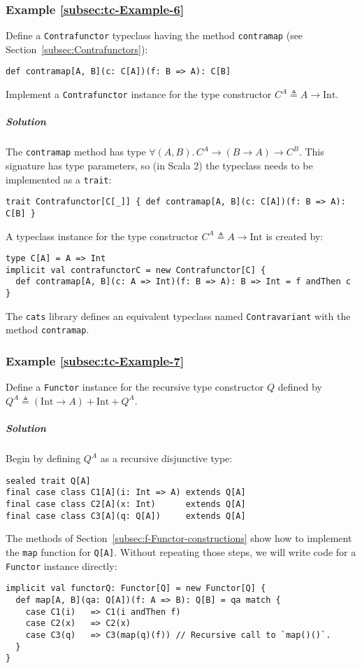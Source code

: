 \subsubsection{Example \label{subsec:tc-Example-6}\ref{subsec:tc-Example-6}}

Define a \lstinline!Contrafunctor! typeclass having the method \lstinline!contramap!
(see Section~\ref{subsec:Contrafunctors}):
\begin{lstlisting}
def contramap[A, B](c: C[A])(f: B => A): C[B]
\end{lstlisting}
Implement a \lstinline!Contrafunctor! instance for the type constructor
$C^{A}\triangleq A\rightarrow\text{Int}$.

\subparagraph{Solution}

The \lstinline!contramap! method has type $\forall(A,B).\,C^{A}\rightarrow(B\rightarrow A)\rightarrow C^{B}$.
This signature has type parameters, so (in Scala 2) the typeclass
needs to be implemented as a \lstinline!trait!:
\begin{lstlisting}
trait Contrafunctor[C[_]] { def contramap[A, B](c: C[A])(f: B => A): C[B] }
\end{lstlisting}
A typeclass instance for the type constructor $C^{A}\triangleq A\rightarrow\text{Int}$
is created by:
\begin{lstlisting}
type C[A] = A => Int
implicit val contrafunctorC = new Contrafunctor[C] {
  def contramap[A, B](c: A => Int)(f: B => A): B => Int = f andThen c
}
\end{lstlisting}

The \texttt{cats} library defines an equivalent typeclass named \lstinline!Contravariant!
with the method \lstinline!contramap!.

\subsubsection{Example \label{subsec:tc-Example-7}\ref{subsec:tc-Example-7}}

Define a \lstinline!Functor! instance for the recursive type constructor
$Q$ defined by $Q^{A}\triangleq\left(\text{Int}\rightarrow A\right)+\text{Int}+Q^{A}$.

\subparagraph{Solution}

Begin by defining $Q^{A}$ as a recursive disjunctive type:
\begin{lstlisting}
sealed trait Q[A]
final case class C1[A](i: Int => A) extends Q[A]
final case class C2[A](x: Int)      extends Q[A]
final case class C3[A](q: Q[A])     extends Q[A]
\end{lstlisting}
The methods of Section~\ref{subsec:f-Functor-constructions} show
how to implement the \lstinline!map! function for \lstinline!Q[A]!.
Without repeating those steps, we will write code for a \lstinline!Functor!
instance directly:
\begin{lstlisting}
implicit val functorQ: Functor[Q] = new Functor[Q] {
  def map[A, B](qa: Q[A])(f: A => B): Q[B] = qa match {
    case C1(i)   => C1(i andThen f)
    case C2(x)   => C2(x)
    case C3(q)   => C3(map(q)(f)) // Recursive call to `map()()`.
  }
}
\end{lstlisting}


